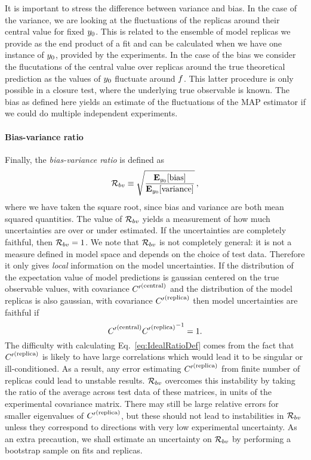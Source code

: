 It is important to stress the difference between variance and bias. In the case
of the variance, we are looking at the fluctuations of the replicas around their
central value for fixed $y_0$. This is related to the ensemble of
model replicas we provide as the end product of a fit and can be calculated when
we have one instance of $y_0$, provided by the experiments. In the
case of the bias we consider the flucutations of the central value over replicas
around the true theoretical prediction as the values of $y_0$
fluctuate around $f$. This latter procedure is only possible in a closure
test, where the underlying true observable is known. The bias as defined here
yields an estimate of the fluctuations of the MAP estimator if we could do
multiple independent experiments.

\paragraph{Bias-variance ratio}

Finally, the {\em bias-variance ratio} is defined as
\begin{equation}
    \label{eq:RatioDef}
    \mathcal{R}_{bv} \equiv \sqrt{\frac{
        \mathbf{E}_{y_0}[ {\rm bias} ]}{
            \mathbf{E}_{y_0}[ {\rm variance} ]}}\, ,
\end{equation}
where we have taken the square root, since bias and variance are both mean
squared quantities. The value of $\mathcal{R}_{bv}$ yields a measurement of how
much uncertainties are over or under estimated. If the uncertainties are
completely faithful, then $\mathcal{R}_{bv} = 1$. 
%
We note that $\mathcal{R}_{bv}$ is not completely general: it is not a measure
defined in model space and depends on the choice of test data. Therefore it only
gives {\em local} information on the model uncertainties. If the distribution of
the expectation value of model predictions is gaussian centered on the true
observable values, with covariance ${{C}^{\prime}}^{(\rm central)}$ and the distribution of the model
replicas is also gaussian, with covariance ${{C}^{\prime}}^{(\rm replica)}$ then model uncertainties
are faithful if
\begin{equation}\label{eq:IdealRatioDef}
    {{C}^{\prime}}^{(\rm central)} {{{C}^{\prime}}^{(\rm replica)}}^{-1} = 1.
\end{equation}
The difficulty with calculating Eq.~\ref{eq:IdealRatioDef} comes from the fact
that ${{C}^{\prime}}^{(\rm replica)}$ is likely to have large correlations which would lead it to be
singular or ill-conditioned. As a result, any error estimating ${{C}^{\prime}}^{(\rm replica)}$ from
finite number of replicas could lead to unstable results. $\mathcal{R}_{bv}$
overcomes this instability by taking the ratio of the average across test data
of these matrices, in units of the experimental covariance matrix. There may
still be large relative errors for smaller eigenvalues of ${{C}^{\prime}}^{(\rm replica)}$, but these
should not lead to instabilities in $\mathcal{R}_{bv}$ unless they correspond to
directions with very low experimental uncertainty. As an extra precaution, we
shall estimate an uncertainty on $\mathcal{R}_{bv}$ by performing a bootstrap
sample on fits and replicas.

